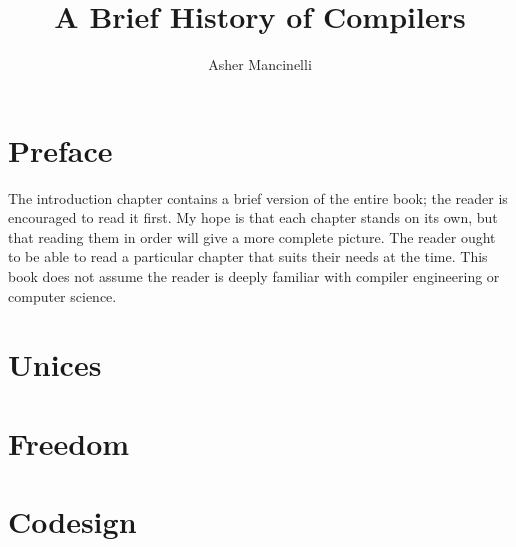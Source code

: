 \documentclass[12pt,openany]{book}
\title{A Brief History of Compilers}
\author{Asher Mancinelli}
\date{}
\begin{document}
\maketitle
\tableofcontents

\chapter{Preface}

The introduction chapter contains a brief version of the entire book; the reader is encouraged to read it first.
My hope is that each chapter stands on its own, but that reading them in order will give a more complete picture.
The reader ought to be able to read a particular chapter that suits their needs at the time.
This book does not assume the reader is deeply familiar with compiler engineering or computer science.




\chapter{Unices}
\chapter{Freedom}
\chapter{Codesign}



\nocite{*}
\printbibliography
\end{document}

